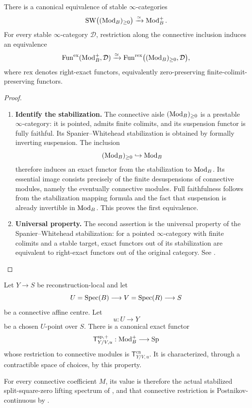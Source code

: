 \begin{proposition}
\label{prop:spanier-whitehead-connective-modules}
There is a canonical equivalence of stable \(\infty\)-categories
\[
    \operatorname{SW}\bigl((\operatorname{Mod}_B)_{\geq0}\bigr)
    \xrightarrow{\simeq}
    \operatorname{Mod}_B^{+}.
\]
For every stable \(\infty\)-category \(\mathcal D\), restriction along the
connective inclusion induces an equivalence
\[
    \operatorname{Fun}^{\mathrm{ex}}(\operatorname{Mod}_B^{+},\mathcal D)
    \xrightarrow{\simeq}
    \operatorname{Fun}^{\mathrm{rex}}
    \bigl((\operatorname{Mod}_B)_{\geq0},\mathcal D\bigr),
\]
where \(\mathrm{rex}\) denotes right-exact functors, equivalently
zero-preserving finite-colimit-preserving functors.
\end{proposition}

\begin{proof}
\leavevmode
\begin{enumerate}[label=\textup{(\arabic*)}]
    \item \textbf{Identify the stabilization.}
    The connective aisle \((\operatorname{Mod}_B)_{\geq0}\) is a prestable
    \(\infty\)-category: it is pointed, admits finite colimits, and its suspension
    functor is fully faithful. Its Spanier--Whitehead stabilization is obtained by
    formally inverting suspension. The inclusion
    \[
        (\operatorname{Mod}_B)_{\geq0}\hookrightarrow\operatorname{Mod}_B
    \]
    therefore induces an exact functor from the stabilization to \(\operatorname{Mod}_B\). Its
    essential image consists precisely of the finite desuspensions of connective
    modules, namely the eventually connective modules. Full faithfulness follows
    from the stabilization mapping formula and the fact that suspension is already
    invertible in \(\operatorname{Mod}_B\). This proves the first equivalence.
    \item \textbf{Universal property.}
    The second assertion is the universal property of the
    Spanier--Whitehead stabilization: for a pointed \(\infty\)-category with
    finite colimits and a stable target, exact functors out of its stabilization
    are equivalent to right-exact functors out of the original category. See
    \cite{LurieHigherAlgebra}.
\end{enumerate}
\end{proof}

\begin{theorem}
\label{thm:reconstruction-tangent-spectrum}
Let \(Y\to S\) be reconstruction-local and let
\[
    U=\operatorname{Spec}(B)\longrightarrow V=\operatorname{Spec}(R)\longrightarrow S
\]
be a connective affine centre. Let
\[
    u:U\to Y
\]
be a chosen \(U\)-point over \(S\). There is a canonical exact functor
\[
    \mathsf T^{\mathrm{sp},+}_{Y/V,u}:
    \operatorname{Mod}_B^{+}
    \longrightarrow
    \operatorname{Sp}
\]
whose restriction to connective modules is
\(\mathsf T^{\mathrm{cn}}_{Y/V,u}\). It is characterized, through a contractible
space of choices, by this property.

For every connective coefficient \(M\), its value is therefore the actual
stabilized split-square-zero lifting spectrum of
, and that connective restriction is
Postnikov-continuous by
.
\end{theorem}

